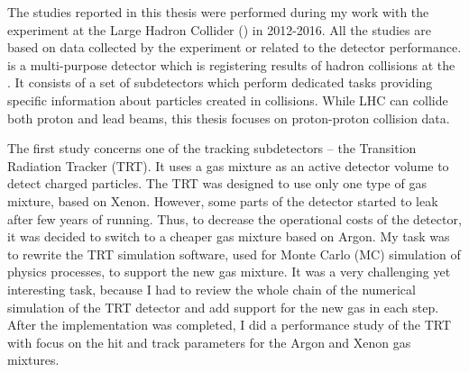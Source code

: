 




\begin{preface}

The studies reported in this thesis were performed during my work with the \ATLAS experiment at the Large Hadron Collider (\LHC) in 2012-2016. All the studies are based on data collected by the \ATLAS experiment or related to the \ATLAS detector performance.
\ATLAS is a multi-purpose detector which is registering results of hadron collisions at the \LHC. It consists of a set of subdetectors which perform dedicated tasks providing specific information about particles created in collisions.
While LHC can collide both proton and lead beams, this thesis focuses on proton-proton collision data.

The first study concerns one of the \ATLAS tracking subdetectors -- the Transition Radiation Tracker (TRT).
It uses a gas mixture as an active detector volume to detect charged particles. The TRT was designed to use only one type of gas mixture, based on Xenon. However, some parts of the detector started to leak after few years of running. Thus, to decrease the operational costs of the detector, it was decided to switch to a cheaper gas mixture based on Argon. My task was to rewrite the TRT simulation software, used for Monte Carlo (MC) simulation of physics processes, to support the new gas mixture. It was a very challenging yet interesting task, because I had to review the whole chain of the numerical simulation of the TRT detector and add support for the new gas in each step. After the implementation was completed, I did a performance study of the TRT with focus on the hit and track parameters for the Argon and Xenon gas mixtures.


\end{preface}
